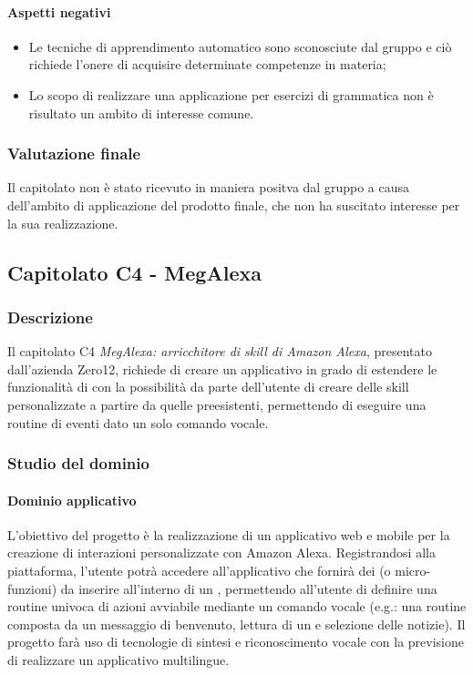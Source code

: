 	\paragraph{Aspetti negativi} 
	\begin{itemize}
		\item {Le tecniche di apprendimento automatico sono sconosciute dal gruppo e ciò richiede l'onere di acquisire determinate competenze in materia;}
		\item {Lo scopo di realizzare una applicazione per esercizi di grammatica non è risultato un ambito di interesse comune.}
	\end{itemize} 
	\subsubsection{Valutazione finale}
	Il capitolato non è stato ricevuto in maniera positva dal gruppo a causa dell'ambito di applicazione del prodotto finale, che non ha suscitato interesse per la sua realizzazione.
	
\subsection{Capitolato C4 - MegAlexa}
\subsubsection{Descrizione}    
Il capitolato C4 \emph{MegAlexa: arricchitore di skill di Amazon Alexa}, presentato dall’azienda Zero12, richiede di creare un applicativo in grado di estendere le funzionalità di  con la possibilità da parte dell’utente di creare delle skill personalizzate a partire da quelle preesistenti, permettendo di eseguire una routine di eventi dato un solo comando vocale.
\subsubsection{Studio del dominio}

\paragraph{Dominio applicativo} \Spazio
L’obiettivo del progetto è la realizzazione di un applicativo web e mobile per la creazione di interazioni personalizzate con Amazon Alexa. Registrandosi alla piattaforma, l’utente potrà accedere all’applicativo che fornirà dei  (o micro-funzioni) da inserire all’interno di un , permettendo all’utente di definire una routine univoca di azioni avviabile mediante un comando vocale (e.g.: una routine composta da un messaggio di benvenuto, lettura di un  e selezione delle notizie). Il progetto farà uso di tecnologie di sintesi e riconoscimento vocale con la previsione di realizzare un applicativo multilingue.
